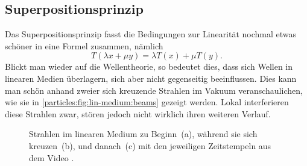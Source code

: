 \subsection{Superpositionsprinzip}\label{particles:section:lin-medium:superposition} %
Das Superpositionsprinzip fasst die Bedingungen zur Linearität nochmal etwas schöner in eine Formel zusammen, 
%
nämlich
\[
    T(\lambda x + \mu y)
    = 
    \lambda T(x) 
    + 
    \mu T(y).
\]
Blickt man wieder auf die Wellentheorie, so bedeutet dies, 
dass sich Wellen in linearen Medien überlagern, 
sich aber nicht gegenseitig beeinflussen.
Dies kann man schön anhand zweier sich kreuzende Strahlen im Vakuum veranschaulichen, 
wie sie in \autoref{particles:fig:lin-medium:beams} gezeigt werden.
Lokal interferieren diese Strahlen zwar, stören jedoch nicht wirklich ihren weiteren Verlauf.
\begin{figure}
    \centering
    \label{particles:fig:lin-medium:beams-1}\hfill
    \label{particles:fig:lin-medium:beams-2}\hfill
    \label{particles:fig:lin-medium:beams-3}
    \caption{Strahlen im linearen Medium zu Beginn~(a), während sie sich kreuzen~(b), und danach~(c) mit den jeweiligen Zeitstempeln aus dem Video \cite{particles:video-beams-lin}.}\label{particles:fig:lin-medium:beams}
\end{figure}


